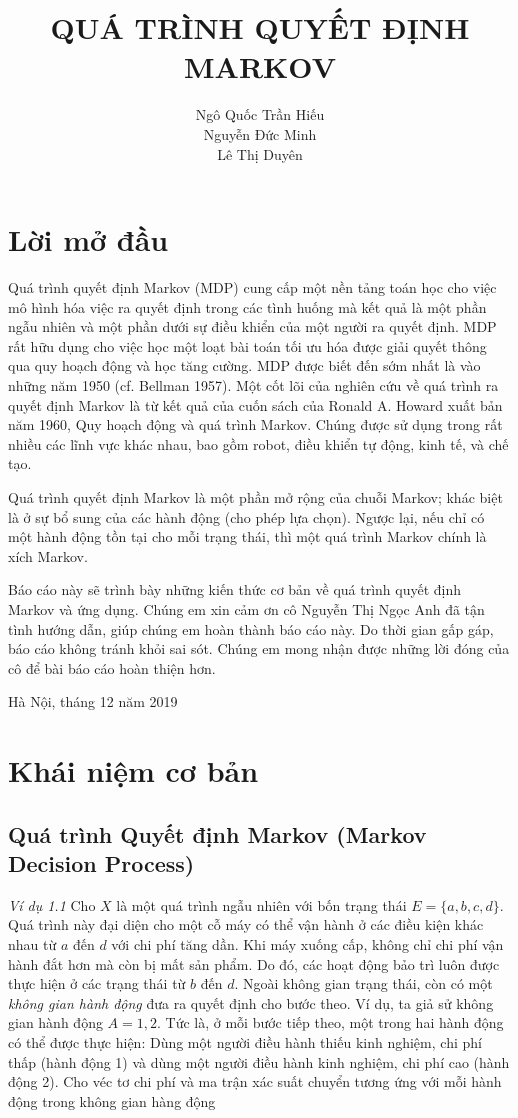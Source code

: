 \documentclass[12pt,a4paper]{report}
\author{Ngô Quốc Trần Hiếu \\Nguyễn Đức Minh \\Lê Thị Duyên}
\title{ \textbf{QUÁ TRÌNH QUYẾT ĐỊNH MARKOV}}
\begin{document}
	\large
	\maketitle
	\chapter*{Lời mở đầu}
	\hspace{0.5cm}Quá trình quyết định Markov (MDP) cung cấp một nền tảng toán học cho việc mô hình hóa việc ra quyết định trong các tình huống mà kết quả là một phần ngẫu nhiên và một phần dưới sự điều khiển của một người ra quyết định. MDP rất hữu dụng cho việc học một loạt bài toán tối ưu hóa được giải quyết thông qua quy hoạch động và học tăng cường. MDP được biết đến sớm nhất là vào những năm 1950 (cf. Bellman 1957). Một cốt lõi của nghiên cứu về quá trình ra quyết định Markov là từ kết quả của cuốn sách của Ronald A. Howard xuất bản năm 1960, Quy hoạch động và quá trình Markov. Chúng được sử dụng trong rất nhiều các lĩnh vực khác nhau, bao gồm robot, điều khiển tự động, kinh tế, và chế tạo.
	
	Quá trình quyết định Markov là một phần mở rộng của chuỗi Markov; khác biệt là ở sự bổ sung của các hành động (cho phép lựa chọn). Ngược lại, nếu chỉ có một hành động tồn tại cho mỗi trạng thái, thì một quá trình Markov chính là xích Markov.
	
	Báo cáo này sẽ trình bày những kiến thức cơ bản về quá trình quyết định Markov và ứng dụng. Chúng em xin cảm ơn cô Nguyễn Thị Ngọc Anh đã tận tình hướng dẫn, giúp chúng em hoàn thành báo cáo này. Do thời gian gấp gáp, báo cáo không tránh khỏi sai sót. Chúng em mong nhận được những lời đóng của cô để bài báo cáo hoàn thiện hơn.
	
	\vfill
	\hfill Hà Nội, tháng 12 năm 2019
	
	\tableofcontents
	\chapter{Khái niệm cơ bản}
	 \section{Quá trình Quyết định Markov (Markov Decision Process)}


   
 	 \textit{Ví dụ 1.1} Cho $X$ là một quá trình ngẫu nhiên với bốn trạng thái $E=\{a,b,c,d\}$. Quá trình này đại diện cho một cỗ máy có thể vận hành ở các điều kiện khác nhau từ $a$ đến $d$ với chi phí tăng dần. Khi máy xuống cấp, không chỉ chi phí vận hành đắt hơn mà còn bị mất sản phẩm. Do đó, các hoạt động bảo trì luôn được thực hiện ở các trạng thái từ $b$ đến $d$. Ngoài không gian trạng thái, còn có một \textit{không gian hành động} đưa ra quyết định cho bước theo. Ví dụ, ta giả sử không gian hành động $A={1,2}$. Tức là, ở mỗi bước tiếp theo, một trong hai hành động có thể được thực hiện: Dùng một người điều hành thiếu kinh nghiệm, chi phí thấp (hành động 1) và dùng một người điều hành kinh nghiệm, chi phí cao (hành động 2). Cho véc tơ chi phí và ma trận xác suất chuyển tương ứng với mỗi hành động trong không gian hàng động
 	 
\end{document}
